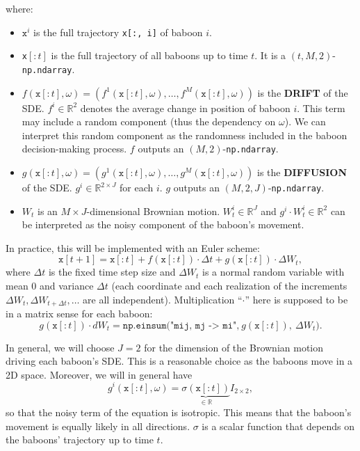 \documentclass[
    article,
    oneside,
]{memoir}
\begin{document}
where:
\begin{itemize}
    \item $\texttt{x}^i$ is the full trajectory \texttt{x[:, i]} of baboon $i$.
    \item \texttt{x}$[:t]$ is the full trajectory of all baboons up to time $t$.
        It is a $(t, M, 2)$-\texttt{np.ndarray}.
    \item $f(\texttt{x}[:t], \omega) = (f^1(\texttt{x}[:t], \omega), \dots, f^M(\texttt{x}[:t], \omega))$ is the \textbf{DRIFT} of the SDE.
        \(f^i\in\mathbb R^2\) denotes the average change in position of baboon $i$.
        This term may include a random component (thus the dependency on
        $\omega$). We can interpret this random component as the randomness included in the baboon decision-making process.
        $f$ outputs an $(M, 2)$-\texttt{np.ndarray}.
    \item $g(\texttt{x}[:t], \omega) = (g^1(\texttt{x}[:t], \omega), \dots, g^M(\texttt{x}[:t], \omega))$ is the \textbf{DIFFUSION} of the SDE.
        \(g^i\in\mathbb R^{2\times J}\) for each $i$.
        $g$ outputs an $(M, 2, J)$-\texttt{np.ndarray}.
    \item $W_t$ is an $M \times J$-dimensional Brownian motion. $W^i_t\in \mathbb{R}^J$ and \(g^i\cdot W^i_t\in\mathbb{R}^2\) can be interpreted as the noisy component of the baboon's movement. 
\end{itemize}

In practice, this will be implemented with an Euler scheme:
\begin{equation}
    \texttt{x}[t+1] = \texttt{x}[:t] + f(\texttt{x}[:t]) \cdot \Delta t + g(\texttt{x}[:t]) \cdot \Delta W_t,
\end{equation}
where $\Delta t$ is the fixed time step size and $\Delta W_t$ is a normal random variable
with mean $0$ and variance $\Delta t$ (each coordinate and each realization of the increments $\Delta W_t,\Delta W_{t+\Delta t},\dots$ are all independent). Multiplication ``$\cdot$'' here is supposed to be in a
matrix sense for each baboon:
\begin{equation}
    g(\texttt{x}[:t]) \cdot dW_t = \texttt{np.einsum("mij, mj -> mi",}\ g(\texttt{x}[:t]),\ \Delta W_t\texttt{)}.
\end{equation}

In general, we will choose \(J = 2\) for the dimension of the Brownian motion driving each baboon's SDE. This is a reasonable choice as the baboons move in a 2D space. Moreover, we will in general have 
\[
    g^i(\texttt{x}[:t], \omega) = \underbrace{\sigma(\texttt{x}[:t])}_{\in\mathbb R} I_{2\times 2},
\]
so that the noisy term of the equation is isotropic. This means that the baboon's movement is equally likely in all directions. $\sigma$ is a scalar function that depends on the baboons' trajectory up to time $t$.
\end{document}
